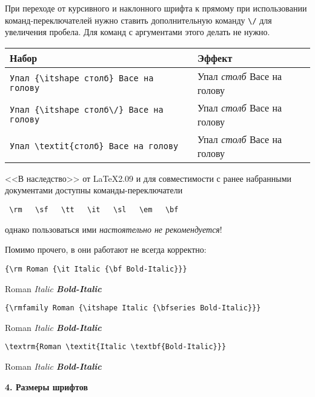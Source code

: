 \documentclass{article}
\begin{document}
При переходе от курсивного и наклонного шрифта к прямому при использовании команд-переключателей нужно ставить дополнительную команду \verb"\/" для увеличения пробела. Для команд с аргументами этого делать не нужно.

\begin{center}
\noindent\begin{tabular}{l|l}
\textbf{Набор}                                & \textbf{Эффект}                        \\ \hline
\verb"Упал {\itshape столб} Васе на голову"   & Упал {\itshape столб} Васе на голову   \\
\verb"Упал {\itshape столб\/} Васе на голову" & Упал {\itshape столб\/} Васе на голову \\
\verb"Упал \textit{столб} Васе на голову"     & Упал \textit{столб} Васе на голову     \\
\end{tabular}
\end{center}

\bigskip

<<В наследство>> от \LaTeX 2.09 и для совместимости с ранее набранными документами доступны команды-переключатели 
\begin{center}
\verb| \rm   \sf   \tt   \it   \sl   \em   \bf|
\end{center}
однако пользоваться ими \emph{настоятельно не рекомендуется}! 

\medskip

Помимо прочего, в \LaTeXe они работают не всегда корректно:

\begin{center}
\verb"{\rm Roman {\it Italic {\bf Bold-Italic}}}"

{\rm Roman {\it Italic {\bf Bold-Italic}}}

\bigskip

\verb"{\rmfamily Roman {\itshape Italic {\bfseries Bold-Italic}}}"  

{\rmfamily Roman {\itshape Italic {\bfseries Bold-Italic}}}

\bigskip

\verb"\textrm{Roman \textit{Italic \textbf{Bold-Italic}}}"

\textrm{Roman \textit{Italic \textbf{Bold-Italic}}}

\end{center}



\newpage

\textbf{4. Размеры шрифтов}
\end{document}

